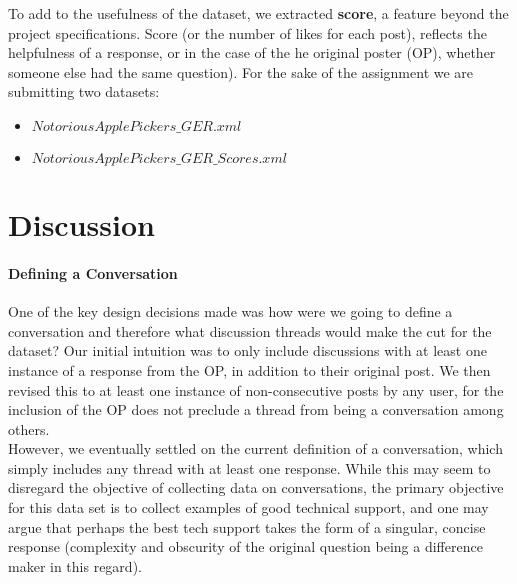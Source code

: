 \documentclass[12pt]{article}
\begin{document}
To add to the usefulness of the dataset, we extracted \textbf{score}, a feature beyond the project specifications. Score (or the number of likes for each post), reflects the helpfulness of a response, or in the case of the he original poster (OP), whether someone else had the same question). For the sake of the assignment we are submitting two datasets:
\begin{itemize}
\item{$NotoriousApplePickers\_GER.xml$}
\item{$NotoriousApplePickers\_GER\_Scores.xml$}
\end{itemize}




\section{Discussion}
\paragraph{Defining a Conversation}
One of the key design decisions made was how were we going to define a conversation and therefore what discussion threads would make the cut for the dataset? Our initial intuition was to only include discussions with at least one instance of a response from the OP, in addition to their original post. We then revised this to at least one instance of non-consecutive posts by any user, for the inclusion of the OP does not preclude a thread from being a conversation among others.\\

However, we eventually settled on the current definition of a conversation, which simply includes any thread with at least one response. While this may seem to disregard the objective of collecting data on conversations, the primary objective for this data set is to collect examples of good technical support, and one may argue that perhaps the best tech support takes the form of a singular, concise response (complexity and obscurity of the original question being a difference maker in this regard).\\
\end{document}
